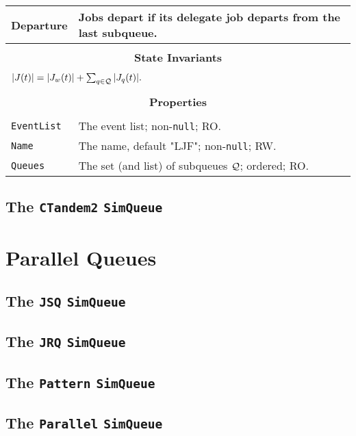 \documentclass[12pt]{book}
\begin{document}
\begin{tabular}{|l|l|}
\hline
Departure & Jobs depart if its delegate job departs from the last subqueue. \\
\hline
\multicolumn{2}{|c|}{} \\
\multicolumn{2}{|c|}{\bf State  Invariants} \\
\multicolumn{2}{|c|}{} \\
\hline
\multicolumn{2}{|l|}{$|J(t)| = |J_{w}(t)| + \sum_{q \in \cal{Q}} |J_{q}(t)|.$} \\
\hline
\multicolumn{2}{|c|}{} \\
\multicolumn{2}{|c|}{\bf Properties} \\
\multicolumn{2}{|c|}{} \\
\hline
\lstinline|EventList|  & The event list; non-\lstinline|null|; RO. \\
\hline
\lstinline|Name|       & The name, default "LJF"; non-\lstinline|null|; RW. \\
\hline
\lstinline|Queues|     & The set (and list) of subqueues $\cal{Q}$; ordered; RO. \\
\hline
\end{tabular}


\subsection{The \lstinline{CTandem2} \lstinline{SimQueue}}

\section{Parallel Queues}

\subsection{The \lstinline{JSQ} \lstinline{SimQueue}}

\subsection{The \lstinline{JRQ} \lstinline{SimQueue}}

\subsection{The \lstinline{Pattern} \lstinline{SimQueue}}

\subsection{The \lstinline{Parallel} \lstinline{SimQueue}}
\end{document}
